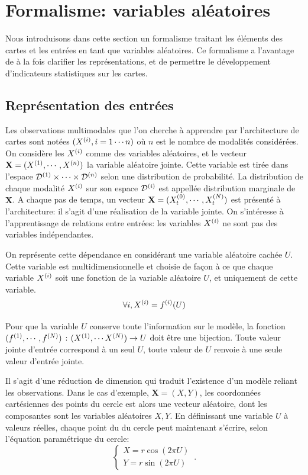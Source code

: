 \section{Formalisme: variables aléatoires}

Nous introduisons dans cette section un formalisme traitant les éléments des cartes et les entrées en tant que variables aléatoires. Ce formalisme a l'avantage de à la fois clarifier les représentations, et de permettre le développement d'indicateurs statistiques sur les cartes.

\subsection{Représentation des entrées}

Les observations multimodales que l'on cherche à apprendre par l'architecture de cartes sont notées $(X^{({i})}, i = 1 \cdots n)$ où $n$ est le nombre de modalités considérées. On considère les $X^{({i})}$ comme des variables aléatoires, et le vecteur $\mathbf{X} = (X^{({1})}, \cdots, X^{({n})})$ la variable aléatoire jointe. Cette variable est tirée dans l'espace $\mathcal{D}^{({1})} \times \cdots \times \mathcal{D}^{({n})}$ selon une distribution de probabilité. La distribution de chaque modalité $X^{({i})}$ sur son espace $\mathcal{D}^{({i})}$ est appellée distribution marginale de $\mathbf{X}$.
A chaque pas de temps, un vecteur $\mathbf{X} = (X^{({0})}_t, \cdots , X^{({N})}_t)$ est présenté à l'architecture: il s'agit d'une réalisation de la variable jointe. On s'intéresse à l'apprentissage de relations entre entrées: les variables $X^{({i})}$ ne sont pas des variables indépendantes.

On représente cette dépendance en considérant une variable aléatoire cachée $U$. Cette variable est multidimensionnelle et choisie de façon à ce que chaque variable $X^{({i})}$ soit une fonction de la variable aléatoire $U$, et uniquement de cette variable.
\begin{equation}
\forall i, X^{({i})} = f^{({i})}(U)
\label{eq:U}
\end{equation}

Pour que la variable $U$ conserve toute l'information sur le modèle, la fonction $(f^{({1})}, \cdots, f^{({N})})$ : $(X^{({1})}, \cdots X^{({N})})\rightarrow U$ doit être une bijection. Toute valeur jointe d'entrée correspond à un seul $U$, toute valeur de $U$ renvoie à une seule valeur d'entrée jointe.


Il s'agit d'une réduction de dimension qui traduit l'existence d'un modèle reliant les observations.
Dans le cas d'exemple, $\mathbf{X} = (X,Y)$, les coordonnées cartésiennes des points du cercle est alors une vecteur aléatoire, dont les composantes sont les variables aléatoires $X,Y$. En définissant une variable $U$ à valeurs réelles, chaque point du du cercle peut maintenant s'écrire, selon l'équation paramétrique du cercle:
\begin{equation}
 \begin{cases}
     X = r  \cos(2\pi U)\\
     Y = r \sin(2 \pi U)
    \end{cases}\,.
\end{equation}

